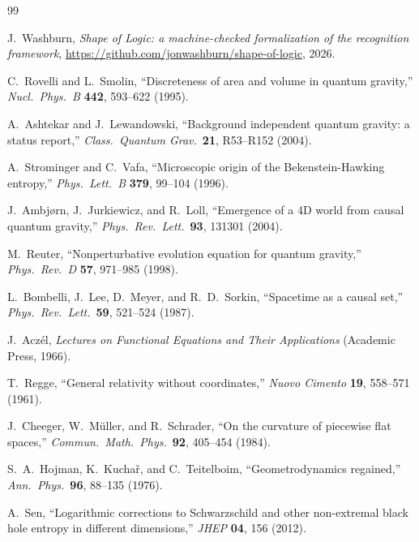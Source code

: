 \documentclass[11pt,letterpaper]{article}
\theoremstyle{definition}
\begin{document}
\begin{thebibliography}{99}

J.~Washburn, \emph{Shape of Logic: a machine-checked formalization of
the recognition framework}, \url{https://github.com/jonwashburn/shape-of-logic}, 2026.

C.~Rovelli and L.~Smolin, ``Discreteness of area and volume in quantum
gravity,'' \emph{Nucl.\ Phys.\ B} \textbf{442}, 593--622 (1995).

A.~Ashtekar and J.~Lewandowski, ``Background independent quantum
gravity: a status report,'' \emph{Class.\ Quantum Grav.}\ \textbf{21},
R53--R152 (2004).

A.~Strominger and C.~Vafa, ``Microscopic origin of the
Bekenstein-Hawking entropy,'' \emph{Phys.\ Lett.\ B} \textbf{379},
99--104 (1996).

J.~Ambj\o rn, J.~Jurkiewicz, and R.~Loll, ``Emergence of a 4D world
from causal quantum gravity,'' \emph{Phys.\ Rev.\ Lett.}\ \textbf{93},
131301 (2004).

M.~Reuter, ``Nonperturbative evolution equation for quantum gravity,''
\emph{Phys.\ Rev.\ D} \textbf{57}, 971--985 (1998).

L.~Bombelli, J.~Lee, D.~Meyer, and R.~D.~Sorkin, ``Spacetime as a
causal set,'' \emph{Phys.\ Rev.\ Lett.}\ \textbf{59}, 521--524 (1987).

J.~Acz\'el, \emph{Lectures on Functional Equations and Their
Applications} (Academic Press, 1966).

T.~Regge, ``General relativity without coordinates,''
\emph{Nuovo Cimento} \textbf{19}, 558--571 (1961).

J.~Cheeger, W.~M\"uller, and R.~Schrader, ``On the curvature of
piecewise flat spaces,'' \emph{Commun.\ Math.\ Phys.}\ \textbf{92},
405--454 (1984).

S.~A.~Hojman, K.~Kucha\v{r}, and C.~Teitelboim, ``Geometrodynamics
regained,'' \emph{Ann.\ Phys.}\ \textbf{96}, 88--135 (1976).

A.~Sen, ``Logarithmic corrections to Schwarzschild and other
non-extremal black hole entropy in different dimensions,''
\emph{JHEP} \textbf{04}, 156 (2012).


\end{thebibliography}
\end{document}
